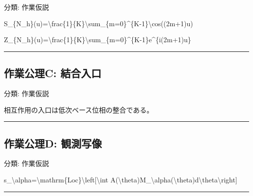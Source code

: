 \documentclass[
  a4paper]{ltjsarticle}
\newenvironment{Shaded}{}{}
\newcommand{\NormalTok}[1]{#1}
\begin{document}
分類: 作業仮説

\begin{Shaded}
\begin{Highlighting}[]
\NormalTok{S\_\{N\_h\}(u)=\textbackslash{}frac\{1\}\{K\}\textbackslash{}sum\_\{m=0\}\^{}\{K{-}1\}\textbackslash{}cos((2m+1)u)}
\end{Highlighting}
\end{Shaded}

\begin{Shaded}
\begin{Highlighting}[]
\NormalTok{Z\_\{N\_h\}(u)=\textbackslash{}frac\{1\}\{K\}\textbackslash{}sum\_\{m=0\}\^{}\{K{-}1\}e\^{}\{i(2m+1)u\}}
\end{Highlighting}
\end{Shaded}

\begin{center}\rule{0.5\linewidth}{0.5pt}\end{center}

\subsection{作業公理C:
結合入口}\label{ux4f5cux696dux516cux7406c-ux7d50ux5408ux5165ux53e3}

分類: 作業仮説

相互作用の入口は低次ベース位相の整合である。

\begin{center}\rule{0.5\linewidth}{0.5pt}\end{center}

\subsection{作業公理D:
観測写像}\label{ux4f5cux696dux516cux7406d-ux89b3ux6e2cux5199ux50cf}

分類: 作業仮説

\begin{Shaded}
\begin{Highlighting}[]
\NormalTok{s\_\textbackslash{}alpha=\textbackslash{}mathrm\{Loc\}\textbackslash{}left[\textbackslash{}int A(\textbackslash{}theta)M\_\textbackslash{}alpha(\textbackslash{}theta)d\textbackslash{}theta\textbackslash{}right]}
\end{Highlighting}
\end{Shaded}

\begin{center}\rule{0.5\linewidth}{0.5pt}\end{center}
\end{document}
